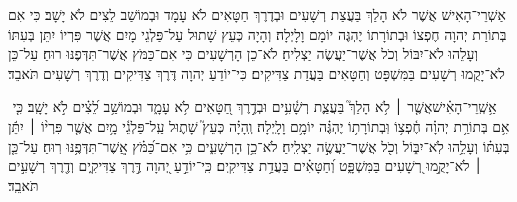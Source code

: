 \documentclass{article}
\begin{document}
\bigskip


אַשְׁרֵי־הָאִישׁ אֲשֶׁר לֹא הָלַךְ בַּעֲצַת רְשָׁעִים וּבְדֶרֶךְ
חַטָּאִים לֹא עָמָד וּבְמוֹשַׁב לֵצִים לֹא יָשָׁב׃ כִּי אִם בְּתוֹרַת
יְהוָה חֶפְצוֹ וּבְתוֹרָתוֹ יֶהְגֶּה יוֹמָם וָלָיְלָה׃ וְהָיָה כְּעֵץ
שָׁתוּל עַל־פַּלְגֵי מָיִם אֲשֶׁר פִּרְיוֹ יִתֵּן בְּעִתּוֹ וְעָלֵהוּ
לֹא־יִבּוֹל וְכֹל אֲשֶׁר־יַעֲשֶׂה יַצְלִיחַ׃ לֹא־כֵן הָרְשָׁעִים כִּי
אִם־כַּמֹּץ אֲשֶׁר־תִּדְּפֶנּוּ רוּחַ׃ עַל־כֵּן לֹא־יָקֻמוּ רְשָׁעִים
בַּמִּשְׁפָּט וְחַטָּאִים בַּעֲדַת צַדִּיקִים׃ כִּי־יוֹדֵעַ יְהוָה
דֶּרֶךְ צַדִּיקִים וְדֶרֶךְ רְשָׁעִים תֹּאבֵד׃

אַ֥שְֽׁרֵי־הָאִ֗ישׁ‪ אֲשֶׁ֤ר ׀ לֹ֥א הָלַךְ֮ בַּעֲצַ֪ת רְשָׁ֫עִ֥ים
וּבְדֶ֣רֶךְ חַ֭טָּאִים לֹ֥א עָמָ֑ד וּבְמוֹשַׁ֥ב לֵ֝צִ֗ים לֹ֣א יָשָֽׁב׃
כִּ֤י אִ֥ם בְּתוֹרַ֥ת יְהוָ֗ה חֶ֫פְצ֥וֹ וּֽבְתוֹרָת֥וֹ יֶהְגֶּ֗ה
יוֹמָ֥ם וָלָֽיְלָה׃ וְֽהָיָ֗ה כְּעֵץ֮ שָׁת֪וּל עַֽל־פַּלְגֵ֫י מָ֥יִם
אֲשֶׁ֤ר פִּרְי֨וֹ ׀ יִתֵּ֬ן בְּעִתּ֗וֹ וְעָלֵ֥הוּ לֹֽא־יִבּ֑וֹל וְכֹ֖ל
אֲשֶׁר־יַעֲשֶׂ֣ה יַצְלִֽיחַ׃ לֹא־כֵ֥ן הָרְשָׁעִ֑ים כִּ֥י אִם־כַּ֝מֹּ֗ץ
אֲ‍ֽשֶׁר־תִּדְּפֶ֥נּוּ רֽוּחַ׃ עַל־כֵּ֤ן ׀ לֹא־יָקֻ֣מוּ רְ֭שָׁעִים
בַּמִּשְׁפָּ֑ט וְ֝חַטָּאִ֗ים בַּעֲדַ֥ת צַדִּיקִֽים׃ כִּֽי־יוֹדֵ֣עַ
יְ֭הוָה דֶּ֣רֶךְ צַדִּיקִ֑ים וְדֶ֖רֶךְ רְשָׁעִ֣ים תֹּאבֵֽד׃
\end{document}
